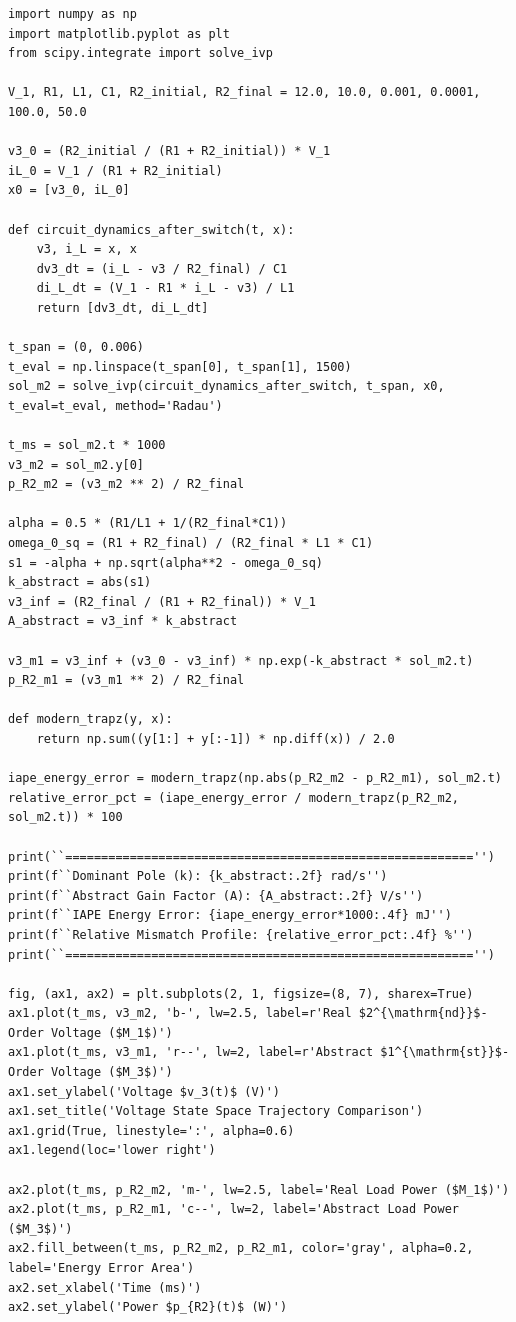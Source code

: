 \documentclass[energies,accept,oneauthor,pdftex]{Definitions/mdpi}
\begin{document}
{\footnotesize
\begin{verbatim}
import numpy as np
import matplotlib.pyplot as plt
from scipy.integrate import solve_ivp

V_1, R1, L1, C1, R2_initial, R2_final = 12.0, 10.0, 0.001, 0.0001, 100.0, 50.0

v3_0 = (R2_initial / (R1 + R2_initial)) * V_1
iL_0 = V_1 / (R1 + R2_initial)
x0 = [v3_0, iL_0]

def circuit_dynamics_after_switch(t, x):
    v3, i_L = x, x
    dv3_dt = (i_L - v3 / R2_final) / C1
    di_L_dt = (V_1 - R1 * i_L - v3) / L1
    return [dv3_dt, di_L_dt]

t_span = (0, 0.006)
t_eval = np.linspace(t_span[0], t_span[1], 1500)
sol_m2 = solve_ivp(circuit_dynamics_after_switch, t_span, x0, t_eval=t_eval, method='Radau')

t_ms = sol_m2.t * 1000
v3_m2 = sol_m2.y[0]
p_R2_m2 = (v3_m2 ** 2) / R2_final

alpha = 0.5 * (R1/L1 + 1/(R2_final*C1))
omega_0_sq = (R1 + R2_final) / (R2_final * L1 * C1)
s1 = -alpha + np.sqrt(alpha**2 - omega_0_sq)
k_abstract = abs(s1)
v3_inf = (R2_final / (R1 + R2_final)) * V_1
A_abstract = v3_inf * k_abstract

v3_m1 = v3_inf + (v3_0 - v3_inf) * np.exp(-k_abstract * sol_m2.t)
p_R2_m1 = (v3_m1 ** 2) / R2_final

def modern_trapz(y, x):
    return np.sum((y[1:] + y[:-1]) * np.diff(x)) / 2.0

iape_energy_error = modern_trapz(np.abs(p_R2_m2 - p_R2_m1), sol_m2.t)
relative_error_pct = (iape_energy_error / modern_trapz(p_R2_m2, sol_m2.t)) * 100

print(``========================================================='')
print(f``Dominant Pole (k): {k_abstract:.2f} rad/s'')
print(f``Abstract Gain Factor (A): {A_abstract:.2f} V/s'')
print(f``IAPE Energy Error: {iape_energy_error*1000:.4f} mJ'')
print(f``Relative Mismatch Profile: {relative_error_pct:.4f} %'')
print(``========================================================='')

fig, (ax1, ax2) = plt.subplots(2, 1, figsize=(8, 7), sharex=True)
ax1.plot(t_ms, v3_m2, 'b-', lw=2.5, label=r'Real $2^{\mathrm{nd}}$-Order Voltage ($M_1$)')
ax1.plot(t_ms, v3_m1, 'r--', lw=2, label=r'Abstract $1^{\mathrm{st}}$-Order Voltage ($M_3$)')
ax1.set_ylabel('Voltage $v_3(t)$ (V)')
ax1.set_title('Voltage State Space Trajectory Comparison')
ax1.grid(True, linestyle=':', alpha=0.6)
ax1.legend(loc='lower right')

ax2.plot(t_ms, p_R2_m2, 'm-', lw=2.5, label='Real Load Power ($M_1$)')
ax2.plot(t_ms, p_R2_m1, 'c--', lw=2, label='Abstract Load Power ($M_3$)')
ax2.fill_between(t_ms, p_R2_m2, p_R2_m1, color='gray', alpha=0.2, label='Energy Error Area')
ax2.set_xlabel('Time (ms)')
ax2.set_ylabel('Power $p_{R2}(t)$ (W)')
\end{verbatim}
}
\end{document}
